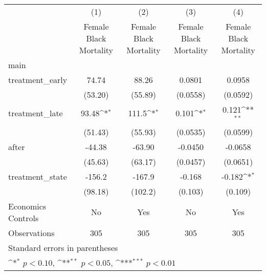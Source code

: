 {
\def\sym#1{\ifmmode^{#1}\else\(^{#1}\)\fi}
\begin{longtable}{l*{4}{c}}
\hline\hline\endfirsthead\hline\endhead\hline\endfoot\endlastfoot
                    &\multicolumn{1}{c}{(1)}&\multicolumn{1}{c}{(2)}&\multicolumn{1}{c}{(3)}&\multicolumn{1}{c}{(4)}\\
                    &\multicolumn{1}{c}{Female Black Mortality}&\multicolumn{1}{c}{Female Black Mortality}&\multicolumn{1}{c}{Female Black Mortality}&\multicolumn{1}{c}{Female Black Mortality}\\
\hline
main                &                     &                     &                     &                     \\
treatment\_early     &       74.74         &       88.26         &      0.0801         &      0.0958         \\
                    &     (53.20)         &     (55.89)         &    (0.0558)         &    (0.0592)         \\
[1em]
treatment\_late      &       93.48\sym{*}  &       111.5\sym{*}  &       0.101\sym{*}  &       0.121\sym{**} \\
                    &     (51.43)         &     (55.93)         &    (0.0535)         &    (0.0599)         \\
[1em]
after               &      -44.38         &      -63.90         &     -0.0450         &     -0.0658         \\
                    &     (45.63)         &     (63.17)         &    (0.0457)         &    (0.0651)         \\
[1em]
treatment\_state     &      -156.2         &      -167.9         &      -0.168         &      -0.182\sym{*}  \\
                    &     (98.18)         &     (102.2)         &     (0.103)         &     (0.109)         \\
[1em]
Economics Controls  &          No         &         Yes         &          No         &         Yes         \\
\hline
Observations        &         305         &         305         &         305         &         305         \\
\hline\hline
\multicolumn{5}{l}{\footnotesize Standard errors in parentheses}\\
\multicolumn{5}{l}{\footnotesize \sym{*} \(p<0.10\), \sym{**} \(p<0.05\), \sym{***} \(p<0.01\)}\\
\end{longtable}
}
